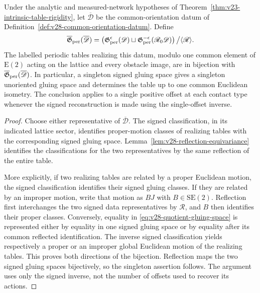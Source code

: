 \begin{theorem}
\label{thm:v28-unoriented-classification}
Under the analytic and measured-network hypotheses of
Theorem~\ref{thm:v23-intrinsic-table-rigidity}, let
\(\overline{\mathscr D}\) be the common-orientation datum of
Definition~\ref{def:v28-common-orientation-datum}.  Define
\begin{equation}\label{eq:v28-quotient-gluing-space}
 \overline{\mathfrak G}_{\rm per}(\overline{\mathscr D})
 =\left(
    \mathfrak G^\epsilon_{\rm per}(\mathscr D)
    \sqcup
    \mathfrak G^{-\epsilon}_{\rm per}(\mathscr R_0\mathscr D)
   \right)\big/\langle\mathscr R\rangle .
\end{equation}
The labelled periodic tables realizing this datum, modulo one common element
of \(\mathrm E(2)\) acting on the lattice and every obstacle image, are in
bijection with
\(\overline{\mathfrak G}_{\rm per}(\overline{\mathscr D})\).
In particular, a singleton signed gluing space gives a singleton unoriented
gluing space and determines the table up to one common Euclidean isometry.
The conclusion applies to a single positive offset at each contact type
whenever the signed reconstruction is made using the single-offset inverse.
\end{theorem}

\begin{proof}
Choose either representative of \(\overline{\mathscr D}\).  The signed
classification, in its indicated lattice sector, identifies proper-motion
classes of realizing tables with the corresponding signed gluing space.
Lemma~\ref{lem:v28-reflection-equivariance} identifies the classifications
for the two representatives by the same reflection of the entire table.

More explicitly, if two realizing tables are related by a proper Euclidean
motion, the signed classification identifies their signed gluing classes.
If they are related by an improper motion, write that motion as \(B J\) with
\(B\in\mathrm{SE}(2)\).  Reflection first interchanges the two signed data
representatives by \(\mathscr R\), and \(B\) then identifies their proper
classes.  Conversely, equality in \eqref{eq:v28-quotient-gluing-space} is
represented either by equality in one signed gluing space or by equality
after its common reflected identification.  The inverse signed
classification yields respectively a proper or an improper global Euclidean
motion of the realizing tables.  This proves both directions of the
bijection.  Reflection maps the two signed gluing spaces bijectively, so the
singleton assertion follows.  The argument uses only the signed inverse,
not the number of offsets used to recover its actions.
\end{proof}

